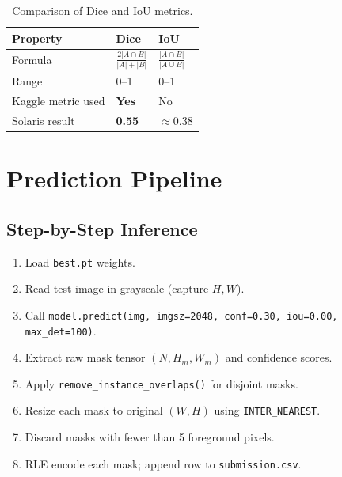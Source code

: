 \documentclass[12pt,a4paper,openany]{report}
\begin{document}
\begin{table}[H]
\centering
\caption{Comparison of Dice and IoU metrics.}
\renewcommand{\arraystretch}{1.3}
\begin{tabular}{l l l}
\toprule
\textbf{Property}  & \textbf{Dice} & \textbf{IoU} \\
\midrule
Formula            & $\frac{2|A\cap B|}{|A|+|B|}$ & $\frac{|A\cap B|}{|A\cup B|}$ \\
Range              & 0--1 & 0--1 \\
Kaggle metric used & \textbf{Yes} & No \\
Solaris result     & \textbf{0.55} & $\approx$0.38 \\
\bottomrule
\end{tabular}
\label{tab:dice_iou}
\end{table}

\chapter{Prediction Pipeline}

\section{Step-by-Step Inference}

\begin{enumerate}
  \item Load \texttt{best.pt} weights.
  \item Read test image in grayscale (capture $H,W$).
  \item Call \texttt{model.predict(img, imgsz=2048, conf=0.30, iou=0.00, max\_det=100)}.
  \item Extract raw mask tensor $(N,H_m,W_m)$ and confidence scores.
  \item Apply \texttt{remove\_instance\_overlaps()} for disjoint masks.
  \item Resize each mask to original $(W,H)$ using \texttt{INTER\_NEAREST}.
  \item Discard masks with fewer than 5 foreground pixels.
  \item RLE encode each mask; append row to \texttt{submission.csv}.
\end{enumerate}
\end{document}
